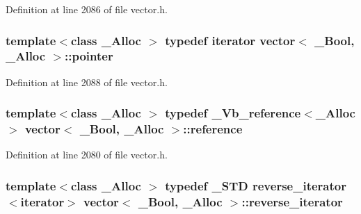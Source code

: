 Definition at line 2086 of file vector.\+h.

\hypertarget{classvector_3_01___bool_00_01___alloc_01_4_a7694039a51b5a3b856f2c1438d6f5700}{
\subsubsection[{pointer}]{\setlength{\rightskip}{0pt plus 5cm}template$<$class \+\_\+\+Alloc $>$ typedef {\bf iterator} {\bf vector}$<$ \+\_\+\+Bool, \+\_\+\+Alloc $>$\+::{\bf pointer}}}\label{classvector_3_01___bool_00_01___alloc_01_4_a7694039a51b5a3b856f2c1438d6f5700}


Definition at line 2088 of file vector.\+h.

\hypertarget{classvector_3_01___bool_00_01___alloc_01_4_afa1a38ae57c26454f265b34ebc302830}{
\subsubsection[{reference}]{\setlength{\rightskip}{0pt plus 5cm}template$<$class \+\_\+\+Alloc $>$ typedef {\bf \+\_\+\+Vb\+\_\+reference}$<$\+\_\+\+Alloc$>$ {\bf vector}$<$ \+\_\+\+Bool, \+\_\+\+Alloc $>$\+::{\bf reference}}}\label{classvector_3_01___bool_00_01___alloc_01_4_afa1a38ae57c26454f265b34ebc302830}


Definition at line 2080 of file vector.\+h.

\hypertarget{classvector_3_01___bool_00_01___alloc_01_4_a91f49dea5e022761921d459ecd97aef7}{
\subsubsection[{reverse\+\_\+iterator}]{\setlength{\rightskip}{0pt plus 5cm}template$<$class \+\_\+\+Alloc $>$ typedef \+\_\+\+S\+T\+D {\bf reverse\+\_\+iterator}$<${\bf iterator}$>$ {\bf vector}$<$ \+\_\+\+Bool, \+\_\+\+Alloc $>$\+::{\bf reverse\+\_\+iterator}}}\label{classvector_3_01___bool_00_01___alloc_01_4_a91f49dea5e022761921d459ecd97aef7}


